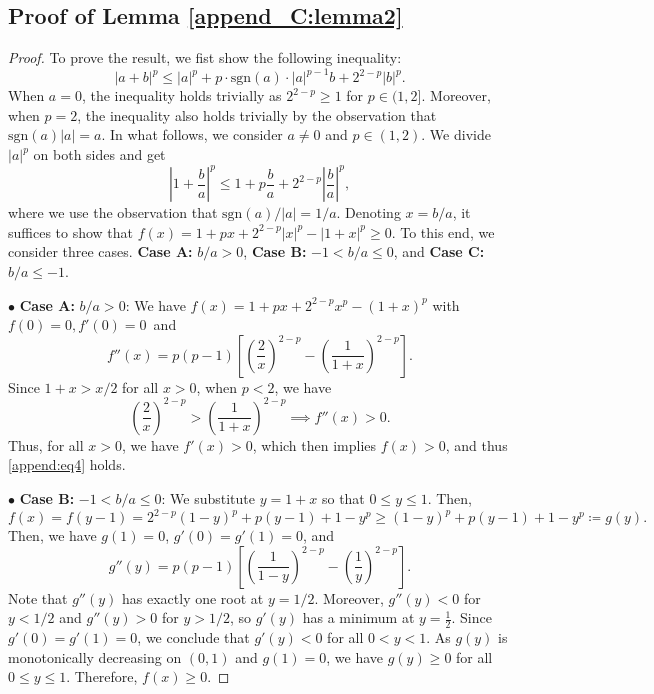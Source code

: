 \documentclass{article}
\theoremstyle{plain}
\theoremstyle{definition}
\theoremstyle{remark}
\begin{document}
\subsection{Proof of Lemma \ref{append_C:lemma2}}\label{proofB1}
\begin{proof}

To prove the result, we fist show the following inequality: \begin{equation}\label{append:eq4}
|a + b|^p \leq |a|^p + p \cdot \text{sgn}(a)\cdot |a|^{p-1} b + 2^{2-p} |b|^p.
\end{equation}
When $a=0$, the inequality holds trivially as $2^{2-p}\geq 1$ for $p\in (1,2]$. Moreover, when $p=2$, the inequality also holds trivially by the observation that $\text{sgn}(a)|a|=a$. In what follows, we consider $a\neq 0$ and $p\in (1,2)$. We divide $|a|^p$ on both sides and get
\begin{equation}\label{append:eq5}
\left|1+ \frac{b}{a}\right|^p \leq 1 + p \frac{b}{a} + 2^{2-p}\left|\frac{b}{a}\right|^p,
\end{equation}
where we use the observation that $\text{sgn}(a)/|a| = 1/a$. Denoting $x=b/a$, it suffices to show that $f(x)= 1 + p x + 2^{2-p}\left|x\right|^p-\left|1+ x \right|^p \geq 0$. To this end, we consider three cases. \textbf{Case A:} $b/a>0$, \textbf{Case B:} $-1<b/a\leq 0$, and \textbf{Case C:} $b/a \leq -1$.

\vskip4pt
\noindent$\bullet$ \textbf{Case A:} $b/a>0$: We have $f(x) = 1+px+2^{2-p}x^p-(1+x)^p$ with $f(0) = 0, f'(0)=0$~and \begin{equation*}
f''(x) = p(p-1) \left[ \left( \frac{2}{x} \right)^{2-p} - \left( \frac{1}{1+x} \right)^{2-p} \right].
\end{equation*}
Since $1 + x > x/2 $ for all $x > 0$, when $p < 2$, we have \begin{equation*}
\left( \frac{2}{x} \right)^{2-p} > \left( \frac{1}{1+x} \right)^{2-p} \implies f''(x) > 0.
\end{equation*}
Thus, for all $x > 0$, we have $f'(x) > 0$, which then implies $f(x) >  0$, and thus \eqref{append:eq4} holds.

\vskip4pt
\noindent $\bullet$ \textbf{Case B:} $-1<b/a\leq 0$: We substitute $y=1+x$ so that $ 0 \leq y \leq 1 $. Then,
\begin{equation*}
f(x)=f(y-1)= 2^{2-p} (1 - y)^p + p (y - 1) + 1 - y^p \geq (1 - y)^p + p (y - 1) + 1 - y^p \coloneqq g(y).
\end{equation*}  
Then, we have $g(1)=0$, $g'(0)=g'(1)=0$, and 
\begin{equation*}
g''(y)= p (p-1) \left[ \left( \frac{1}{1 - y} \right)^{2-p} - \left( \frac{1}{y} \right)^{2-p} \right].
\end{equation*}
Note that $g''(y)$ has exactly one root at $y = 1/2$. Moreover, $ g''(y) < 0 $ for $y < 1/2 $ and $ g''(y) > 0 $ for $y >1/2$, so $ g'(y) $ has a minimum at $ y = \frac{1}{2} $. Since $ g'(0) = g'(1) = 0 $, we conclude that $ g'(y) < 0 $ for all $ 0 < y < 1 $. As $g(y)$ is monotonically decreasing on $(0,1)$ and $g(1)=0$, we have $ g(y) \geq 0 $ for all $0 \leq y \leq 1 $. Therefore, $f(x)\geq 0$.


\end{proof}
\end{document}
